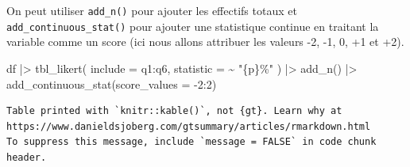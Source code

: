 \documentclass[
  letterpaper,
  DIV=11,
  numbers=noendperiod,
  oneside]{scrreprt}
\newenvironment{Shaded}{\begin{snugshade}}{\end{snugshade}}
\newcommand{\AttributeTok}[1]{\textcolor[rgb]{0.40,0.45,0.13}{#1}}
\newcommand{\DecValTok}[1]{\textcolor[rgb]{0.68,0.00,0.00}{#1}}
\newcommand{\FunctionTok}[1]{\textcolor[rgb]{0.28,0.35,0.67}{#1}}
\newcommand{\NormalTok}[1]{\textcolor[rgb]{0.00,0.23,0.31}{#1}}
\newcommand{\SpecialCharTok}[1]{\textcolor[rgb]{0.37,0.37,0.37}{#1}}
\newcommand{\StringTok}[1]{\textcolor[rgb]{0.13,0.47,0.30}{#1}}
\begin{document}
On peut utiliser \texttt{add\_n()} pour ajouter les effectifs totaux et
\texttt{add\_continuous\_stat()} pour ajouter une statistique continue
en traitant la variable comme un score (ici nous allons attribuer les
valeurs -2, -1, 0, +1 et +2).

\begin{Shaded}
\begin{Highlighting}[]
\NormalTok{df }\SpecialCharTok{|\textgreater{}} 
  \FunctionTok{tbl\_likert}\NormalTok{(}
    \AttributeTok{include =}\NormalTok{ q1}\SpecialCharTok{:}\NormalTok{q6,}
    \AttributeTok{statistic =} \SpecialCharTok{\textasciitilde{}} \StringTok{"\{p\}\%"}
\NormalTok{  ) }\SpecialCharTok{|\textgreater{}} 
  \FunctionTok{add\_n}\NormalTok{() }\SpecialCharTok{|\textgreater{}} 
  \FunctionTok{add\_continuous\_stat}\NormalTok{(}\AttributeTok{score\_values =} \SpecialCharTok{{-}}\DecValTok{2}\SpecialCharTok{:}\DecValTok{2}\NormalTok{)}
\end{Highlighting}
\end{Shaded}

\begin{verbatim}
Table printed with `knitr::kable()`, not {gt}. Learn why at
https://www.danieldsjoberg.com/gtsummary/articles/rmarkdown.html
To suppress this message, include `message = FALSE` in code chunk header.
\end{verbatim}
\end{document}
